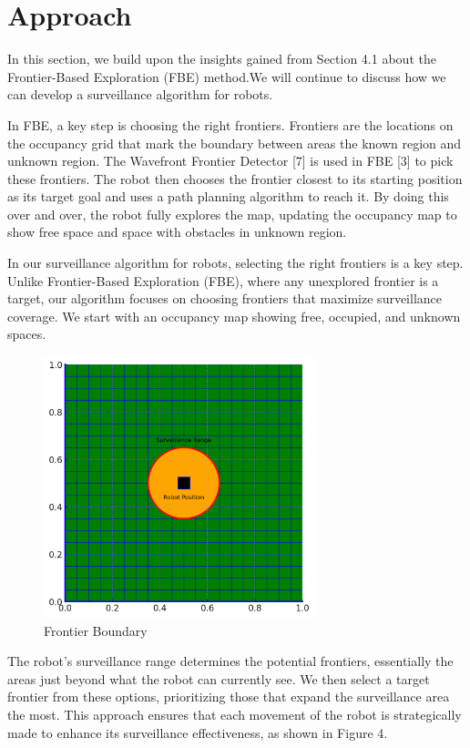 \section{Approach}
\label{sec:Approach}

In this section, we build upon the insights gained from Section 4.1 about the Frontier-Based Exploration (FBE)  method.We will continue to discuss how we can develop a surveillance algorithm for robots.

In FBE, a key step is choosing the right frontiers. Frontiers are the locations on the occupancy grid that mark the boundary between areas the known region and unknown region. The Wavefront Frontier Detector [7] is used in FBE [3] to pick these frontiers. The robot then chooses the frontier closest to its starting position as its  target goal and uses a path planning algorithm to reach it. By doing this over and over, the robot fully explores the map, updating the occupancy map to show free space and space with obstacles in unknown region.

In our surveillance algorithm for robots, selecting the right frontiers is a key step. Unlike Frontier-Based Exploration (FBE), where any unexplored frontier is a target, our algorithm focuses on choosing frontiers that maximize surveillance coverage. We start with an occupancy map showing free, occupied, and unknown spaces.

\begin{figure}[h]
  \centering
  \includegraphics[width=0.7\textwidth, height=0.4\textheight]{Bilder/frontier.png}
  \caption{Frontier Boundary}
  \label{fig:frontier}
\end{figure}

The robot's surveillance range determines the potential frontiers, essentially the areas just beyond what the robot can currently see. We then select a target frontier from these options, prioritizing those that expand the surveillance area the most. This approach ensures that each movement of the robot is strategically made to enhance its surveillance effectiveness, as shown in Figure 4.

